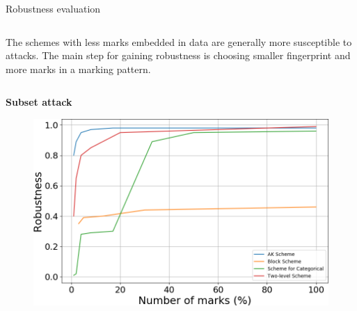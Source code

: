 \documentclass[final,hyperref={pdfpagelabels=true}]{beamer}
\begin{document}
\begin{frame}
\begin{columns}[t]
\begin{column}{.45\textwidth}
\begin{block}{Robustness evaluation}
\begin{columns}
\begin{column}{.49\textwidth}
            \end{column}
        \end{columns}
        \bigskip
        \bigskip
        \bigskip
        \small
        The schemes with less marks embedded in data are generally more susceptible to attacks. The main step for gaining robustness is choosing smaller fingerprint and more marks in a marking pattern.
        \bigskip
        \bigskip
        \begin{columns}
            \begin{column}{.49\textwidth}
            \centering
            \textcolor{myred}{\textbf{Subset attack}}
                \begin{figure}
                    \centering
                    \includegraphics[width=\textwidth]{subset_poster.png}
                \end{figure}
            \end{column}
            

\end{columns}
\end{block}
\end{column}
\end{columns}
\end{frame}
\end{document}

